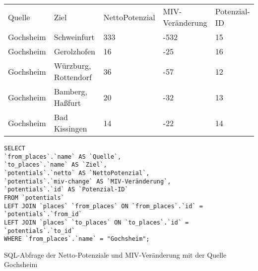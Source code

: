 \begin{tabularx}{\textwidth}{*5{X}}
    Quelle & Ziel & NettoPotenzial & MIV-Veränderung & Potenzial-ID\\ 
    Gochsheim & Schweinfurt & 333 & -532 & 15\\ 
    Gochsheim & Gerolzhofen & 16 & -25 & 16\\ 
    Gochsheim & Würzburg, Rottendorf & 36 & -57 & 12\\ 
    Gochsheim & Bamberg, Haßfurt & 20 & -32 & 13\\ 
    Gochsheim & Bad Kissingen & 14 & -22 & 14\\ 
    \end{tabularx}    
\newline
\newline
\begin{listing}[htbp]
\begin{verbatim}
SELECT
`from_places`.`name` AS `Quelle`, 
`to_places`.`name` AS `Ziel`, 
`potentials`.`netto` AS `NettoPotenzial`, 
`potentials`.`miv-change` AS `MIV-Veränderung`, 
`potentials`.`id` AS `Potenzial-ID`
FROM `potentials`
LEFT JOIN `places` `from_places` ON `from_places`.`id` = `potentials`.`from_id`
LEFT JOIN `places` `to_places` ON `to_places`.`id` = `potentials`.`to_id`
WHERE `from_places`.`name` = "Gochsheim";
\end{verbatim}
\caption{SQL-Abfrage der Netto-Potenziale und MIV-Veränderung mit der Quelle Gochsheim}\label{lst-fz-gochsheim}
\end{listing}